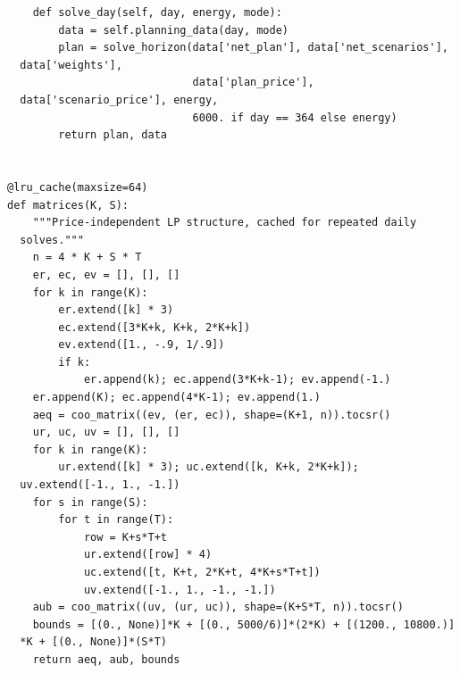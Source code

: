 \begin{verbatim}
    def solve_day(self, day, energy, mode):
        data = self.planning_data(day, mode)
        plan = solve_horizon(data['net_plan'], data['net_scenarios'],
  data['weights'],
                             data['plan_price'],
  data['scenario_price'], energy,
                             6000. if day == 364 else energy)
        return plan, data


@lru_cache(maxsize=64)
def matrices(K, S):
    """Price-independent LP structure, cached for repeated daily
  solves."""
    n = 4 * K + S * T
    er, ec, ev = [], [], []
    for k in range(K):
        er.extend([k] * 3)
        ec.extend([3*K+k, K+k, 2*K+k])
        ev.extend([1., -.9, 1/.9])
        if k:
            er.append(k); ec.append(3*K+k-1); ev.append(-1.)
    er.append(K); ec.append(4*K-1); ev.append(1.)
    aeq = coo_matrix((ev, (er, ec)), shape=(K+1, n)).tocsr()
    ur, uc, uv = [], [], []
    for k in range(K):
        ur.extend([k] * 3); uc.extend([k, K+k, 2*K+k]);
  uv.extend([-1., 1., -1.])
    for s in range(S):
        for t in range(T):
            row = K+s*T+t
            ur.extend([row] * 4)
            uc.extend([t, K+t, 2*K+t, 4*K+s*T+t])
            uv.extend([-1., 1., -1., -1.])
    aub = coo_matrix((uv, (ur, uc)), shape=(K+S*T, n)).tocsr()
    bounds = [(0., None)]*K + [(0., 5000/6)]*(2*K) + [(1200., 10800.)]
  *K + [(0., None)]*(S*T)
    return aeq, aub, bounds



\end{verbatim}
